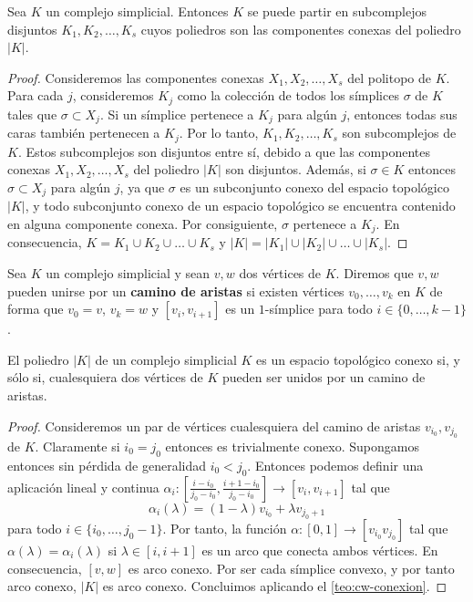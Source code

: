 \begin{proposicion}
	Sea $K$ un complejo simplicial. Entonces $K$ se puede partir en subcomplejos
	disjuntos $K_{1}, K_{2}, \ldots, K_{s}$ cuyos poliedros son las componentes
	conexas del poliedro $|K|$.
\end{proposicion}
\begin{proof}
	Consideremos las componentes conexas $X_{1}, X_{2}, \ldots, X_{s}$ del politopo
	de $K$. Para cada $j$, consideremos $K_{j}$ como la colección de todos los símplices
	$\sigma$ de $K$ tales que $\sigma \subset X_{j}$. Si un símplice pertenece a
	$K_{j}$ para algún $j$, entonces todas sus caras también pertenecen a $K_{j}$.
	Por lo tanto, $K_{1}, K_{2}, \ldots, K_{s}$ son subcomplejos de $K$. Estos
	subcomplejos son disjuntos entre sí, debido a que las componentes conexas $X_{1}
	, X_{2}, \ldots, X_{s}$ del poliedro $|K|$ son disjuntos. Además, si $\sigma \in
	K$ entonces $\sigma \subset X_{j}$ para algún $j$, ya que $\sigma$ es un
	subconjunto conexo del espacio topológico $|K|$, y todo subconjunto conexo de un
	espacio topológico se encuentra contenido en alguna componente conexa. Por
	consiguiente, $\sigma$ pertenece a $K_{j}$. En consecuencia, $K = K_{1} \cup K_{2}
	\cup \ldots \cup K_{s}$ y $|K| = |K_{1}| \cup |K_{2}| \cup \ldots \cup |K_{s}|$.
\end{proof}

\begin{definicion}
	Sea $K$ un complejo simplicial y sean $v,w$ dos vértices de $K$. Diremos que
	$v,w$ pueden unirse por un \textbf{camino de aristas} si existen vértices $v_{0}
	, \ldots, v_{k}$ en $K$ de forma que $v_{0} = v$, $v_{k} = w$ y
	$[v_{i}, v_{i+1}]$ es un $1$-símplice para todo $i \in \{0, \ldots, k-1\}$.
\end{definicion}

\begin{lema}
	\label{lem:edge-path-conexion} El poliedro $|K|$ de un complejo simplicial $K$
	es un espacio topológico conexo si, y sólo si, cualesquiera dos vértices de $K$
	pueden ser unidos por un camino de aristas.
\end{lema}
\begin{proof}
	Consideremos un par de vértices cualesquiera del camino de aristas $v_{i_0}, v_{j_0}$
	de $K$. Claramente si $i_{0} = j_{0}$ entonces es trivialmente conexo. Supongamos
	entonces sin pérdida de generalidad $i_{0} < j_{0}$. Entonces podemos definir
	una aplicación lineal y continua
	$\alpha_{i} : \left[\frac{i-i_{0}}{j_{0}-i_{0}}, \frac{i+1-i_{0}}{j_{0}-i_{0}}\right
	] \to [v_{i}, v_{i+1}]$
	tal que
	\[
	\alpha_{i}(\lambda) = (1-\lambda)v_{i_0}+ \lambda v_{j_0+1}
	\]
	para todo $i \in \{ i_{0}, \ldots, j_{0}-1\}$. Por tanto, la función
	$\alpha : [0,1] \to [v_{i_0}v_{j_0}]$ tal que
	$\alpha(\lambda) = \alpha_{i}(\lambda)$ si $\lambda \in [i, i+1]$ es un arco
	que conecta ambos vértices. En consecuencia, $[v,w]$ es arco conexo. Por ser cada
	símplice convexo, y por tanto arco conexo, $|K|$ es arco conexo. Concluimos
	aplicando el \autoref{teo:cw-conexion}.
\end{proof}

